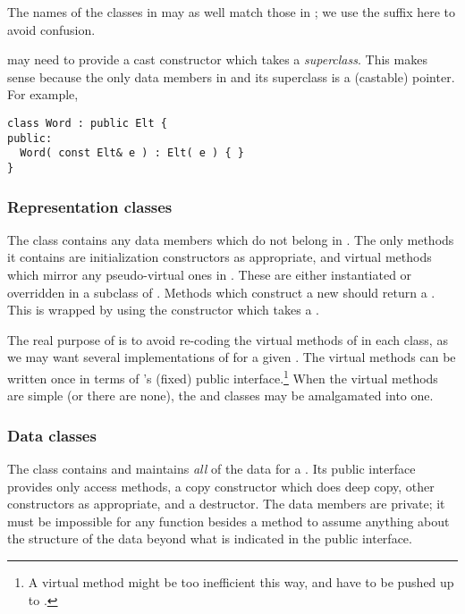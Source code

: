 The names of the classes in  may as well match those in
; we use the  suffix here to avoid confusion.

 may need to provide a cast constructor which takes a
{\em superclass}. This makes sense because the only data members in
 and its superclass is a (castable) pointer. For example,

\lskip
\begin{verbatim}
class Word : public Elt {
public:  
  Word( const Elt& e ) : Elt( e ) { }
}
\end{verbatim}
\lskip

\subsubsection{Representation classes}

The  class contains any data members which do not belong in
. The only methods it contains are initialization
constructors as appropriate, and virtual methods which mirror any
pseudo-virtual ones in .  These are either instantiated or
overridden in a subclass of . Methods which construct a new
 should return a . This is wrapped by
 using the  constructor which takes
a .

The real purpose of  is to avoid re-coding the virtual
methods of  in each  class, as we may want several
implementations of  for a given .  The virtual
methods can be written once in terms of 's (fixed) public
interface.\footnote{A virtual method might be too inefficient this
way, and have to be pushed up to .} When the virtual
methods are simple (or there are none), the  and
 classes may be amalgamated into one.

\subsubsection{Data classes}

The  class contains and maintains {\em all} of the data for
a . Its public interface provides only access methods, a copy
constructor which does deep copy, other constructors as appropriate,
and a destructor. The data members are private; it must be impossible
for any function besides a  method to assume anything
about the structure of the data beyond what is indicated in the public
interface.
